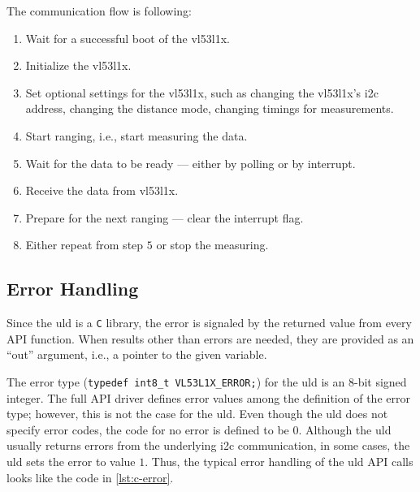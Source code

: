 \documentclass[
  digital,     %
  oneside,     %
  nosansbold,  %
  nocolorbold, %
  nolof,         %
  nolot,         %
]{fithesis4}
\begin{document}
The communication flow is following:
\begin{enumerate}
    \item Wait for a successful boot of the \gls{vl53l1x}.
    
    \item Initialize the \gls{vl53l1x}.
    
    \item  Set optional settings for the \gls{vl53l1x}, such as changing the \gls{vl53l1x}'s
        \acrshort{i2c} address, changing the distance mode, changing timings for measurements.
    
    \item Start ranging, i.e., start measuring the data.
    
    \item Wait for the data to be ready --- either by polling or by interrupt.
    
    \item Receive the data from \gls{vl53l1x}.
    
    \item Prepare for the next ranging --- clear the interrupt flag.
    
    \item Either repeat from step $5$ or stop the measuring.
\end{enumerate}

\subsection{ Error Handling } \label{sec:uld-err}

Since the \acrshort{uld} is a \verb|C| library, the error is signaled by the returned value from
every API function. When results other than errors are needed, they are provided as an ``out''
argument, i.e., a pointer to the given variable.

The error type (\lstinline[breaklines=false]|typedef int8_t VL53L1X_ERROR;|) for the \acrshort{uld}
is an 8-bit signed integer. The full API driver defines error values among the definition of the
error type; however, this is not the case for the \acrshort{uld}. Even though the \acrshort{uld}
does not specify error codes, the code for no error is defined to be $0$. Although the
\acrshort{uld} usually returns errors from the underlying \acrshort{i2c} communication, in some
cases, the \acrshort{uld} sets the error to value $1$. Thus, the typical error handling of the
\acrshort{uld} API calls looks like the code in \autoref{lst:c-error}.
\end{document}
